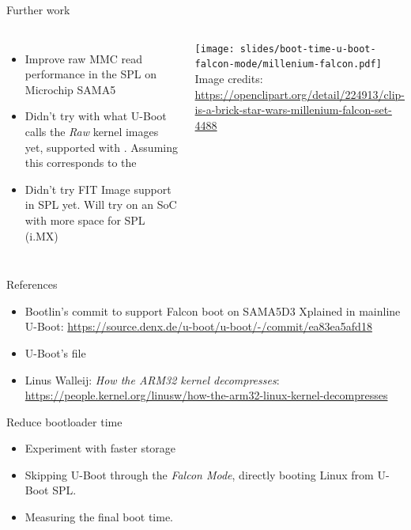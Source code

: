 \begin{frame}{Further work}
   \begin{columns}
   \begin{itemize}
      \item Improve raw MMC read performance in the SPL on Microchip SAMA5
      \item Didn't try with what U-Boot calls the {\em Raw} kernel
            images yet, supported with .
            Assuming this corresponds to the 
      \item Didn't try FIT Image support in SPL yet. Will try on an SoC
	    with more space for SPL (i.MX)
   \end{itemize}
    \begin{center}
     \vspace{1cm}
     \texttt{[image: slides/boot-time-u-boot-falcon-mode/millenium-falcon.pdf]}\\
     \vspace{1cm}
     \tiny Image credits:\\
     \url{https://openclipart.org/detail/224913/clip-is-a-brick-star-wars-millenium-falcon-set-4488}
    \end{center}
   \end{columns}
\end{frame}

\begin{frame}{References}
   \begin{itemize}
      \item Bootlin's commit to support Falcon boot on SAMA5D3 Xplained in mainline U-Boot:
	    {\small \url{https://source.denx.de/u-boot/u-boot/-/commit/ea83ea5afd18}}
      \item U-Boot's  file
      \item Linus Walleij: {\em How the ARM32 kernel decompresses}:\\
	    \small\url{https://people.kernel.org/linusw/how-the-arm32-linux-kernel-decompresses}
   \end{itemize}
\end{frame}

\setuplabframe
{Reduce bootloader time}
{
\begin{itemize}
\item Experiment with faster storage
\item Skipping U-Boot through the {\em Falcon Mode}, directly booting
      Linux from U-Boot SPL.
\item Measuring the final boot time.
\end{itemize}
}

